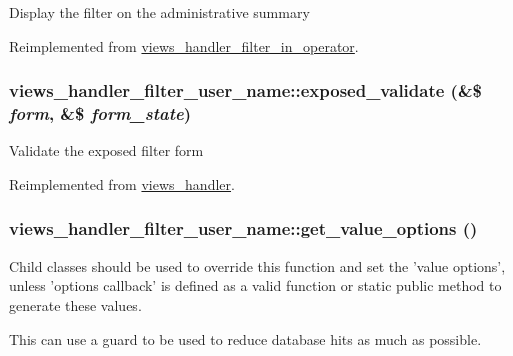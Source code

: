 Display the filter on the administrative summary 

Reimplemented from \hyperlink{classviews__handler__filter__in__operator_2c17bde9b5cb3498d31786ba888d545c}{views\_\-handler\_\-filter\_\-in\_\-operator}.\hypertarget{classviews__handler__filter__user__name_3510a0e9b2c5fea7460a42049e0a58c0}{
\subsubsection[{exposed\_\-validate}]{\setlength{\rightskip}{0pt plus 5cm}views\_\-handler\_\-filter\_\-user\_\-name::exposed\_\-validate (\&\$ {\em form}, \/  \&\$ {\em form\_\-state})}}
\label{classviews__handler__filter__user__name_3510a0e9b2c5fea7460a42049e0a58c0}


Validate the exposed filter form 

Reimplemented from \hyperlink{classviews__handler_2dd536754e4764cc82ffe7c864f54b16}{views\_\-handler}.\hypertarget{classviews__handler__filter__user__name_039044fb84e609938564ae6c8a40580c}{
\subsubsection[{get\_\-value\_\-options}]{\setlength{\rightskip}{0pt plus 5cm}views\_\-handler\_\-filter\_\-user\_\-name::get\_\-value\_\-options ()}}
\label{classviews__handler__filter__user__name_039044fb84e609938564ae6c8a40580c}


Child classes should be used to override this function and set the 'value options', unless 'options callback' is defined as a valid function or static public method to generate these values.

This can use a guard to be used to reduce database hits as much as possible. 

